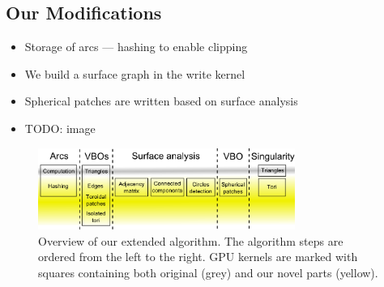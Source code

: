 \subsection{Our Modifications}
\begin{itemize}
  \item Storage of arcs --- hashing to enable clipping
	\item We build a surface graph in the write kernel
	\item Spherical patches are written based on surface analysis
	\item TODO: image
\end{itemize}

\begin{figure}[htb]
  \centering
  \includegraphics[width=3.3in]{image/kernels.png}
  \caption{Overview of our extended algorithm.
	The algorithm steps are ordered from the left to the right.
	GPU kernels are marked with squares containing both original (grey) and our novel parts (yellow).}
	\label{fig:kernels}
\end{figure}

